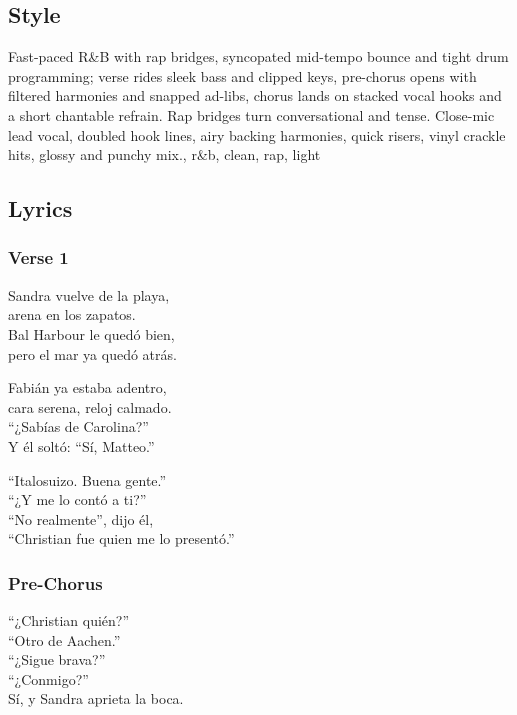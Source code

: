 \subsection{Style}\label{style-17}

Fast-paced R\&B with rap bridges, syncopated mid-tempo bounce and tight
drum programming; verse rides sleek bass and clipped keys, pre-chorus
opens with filtered harmonies and snapped ad-libs, chorus lands on
stacked vocal hooks and a short chantable refrain. Rap bridges turn
conversational and tense. Close-mic lead vocal, doubled hook lines, airy
backing harmonies, quick risers, vinyl crackle hits, glossy and punchy
mix., r\&b, clean, rap, light

\subsection{Lyrics}\label{lyrics-17}

\subsubsection{Verse 1}\label{verse-1-13}

Sandra vuelve de la playa,\\
arena en los zapatos.\\
Bal Harbour le quedó bien,\\
pero el mar ya quedó atrás.

Fabián ya estaba adentro,\\
cara serena, reloj calmado.\\
``¿Sabías de Carolina?''\\
Y él soltó: ``Sí, Matteo.''

``Italosuizo. Buena gente.''\\
``¿Y me lo contó a ti?''\\
``No realmente'', dijo él,\\
``Christian fue quien me lo presentó.''

\subsubsection{Pre-Chorus}\label{pre-chorus-29}

``¿Christian quién?''\\
``Otro de Aachen.''\\
``¿Sigue brava?''\\
``¿Conmigo?''\\
Sí, y Sandra aprieta la boca.

